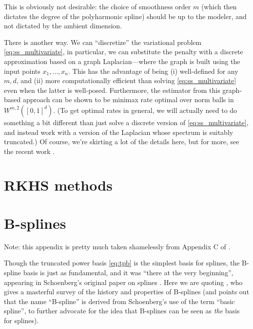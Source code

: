 \documentclass{article}
\begin{document}
This is obviously not desirable: the choice of smoothness order $m$ (which then
dictates the degree of the polyharmonic spline) should be up to the modeler, and
not dictated by the ambient dimension.

There is another way. We can ``discretize'' the variational problem
\eqref{eq:ss_multivariate}, in particular, we can substitute the penalty with a
discrete approximation based on a graph Laplacian---where the graph is built 
using the input points $x_1,\dots,x_n$. This has the advantage of being (i)
well-defined for any $m,d$, and (ii) more computationally efficient than solving 
\eqref{eq:ss_multivariate} even when the latter is well-posed. Furthermore, the
estimator from this graph-based approach can be shown to be minimax rate optimal
over norm balls in $W^{m,2}([0,1]^d)$. (To get optimal rates in general, we will
actually need to do something a bit different than just solve a discrete version 
of \eqref{eq:ss_multivariate}, and instead work with a version of the Laplacian
whose spectrum is suitably truncated.)  Of course, we're skirting a lot of the
details here, but for more, see the recent work \citet{green2021minimax1,
  green2021minimax2}. 

\section{RKHS methods}




\clearpage
\appendix

\section{B-splines}
\label{app:bs}

Note: this appendix is pretty much taken shamelessly from Appendix C of 
\citet{tibshirani2022divided}.

Though the truncated power basis \eqref{eq:tpb} is the simplest basis for
splines, the B-spline basis is just as fundamental, and it was ``there at the 
very beginning'', appearing in Schoenberg's original paper on splines
\citep{schoenberg1946contributions1}. Here we are quoting
\citet{deboor1976splines}, who gives a masterful survey of the history and
properties of B-splines (and points out that the name ``B-spline'' is derived
from Schoenberg's use of the term ``basic spline'', to further advocate for the
idea that B-splines can be seen as \emph{the} basis for splines).
\end{document}
